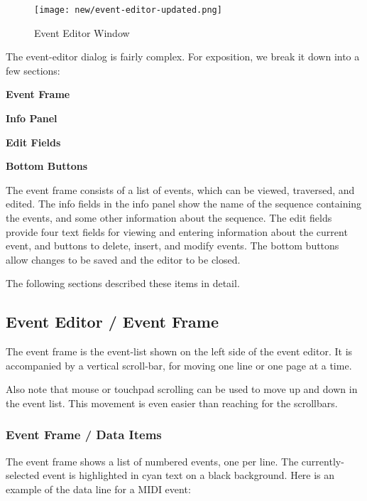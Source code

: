 \begin{figure}[H]
   \centering 
   \texttt{[image: new/event-editor-updated.png]}
   \caption{Event Editor Window}
   \label{fig:event_editor_window}
\end{figure}

   The event-editor dialog is fairly complex.
   For exposition, we break it down into a few sections:

   \begin{enumber}
      \item \textbf{Event Frame}
      \item \textbf{Info Panel}
      \item \textbf{Edit Fields}
      \item \textbf{Bottom Buttons}
   \end{enumber}

   The event frame consists of a list of events, which can be viewed,
   traversed, and edited.  The info fields in the info panel show the name of
   the sequence containing the events, and some other information about the
   sequence.  The edit fields provide four text fields for viewing and entering
   information about the current event, and buttons to delete, insert, and
   modify events.  The bottom buttons allow changes to be saved and the editor
   to be closed.  

   The following sections described these items in detail.

\subsection{Event Editor / Event Frame}
\label{subsec:seq64_event_editor_frame}

   The event frame is the event-list shown on the left side of the
   event editor.  It is accompanied by a vertical scroll-bar, for moving one
   line or one page at a time.

   Also note that mouse or touchpad scrolling can be used to move up and down
   in the event list.  This movement is even easier than reaching for the
   scrollbars.

\subsubsection{Event Frame / Data Items}
\label{subsec:seq64_event_frame_data}

   The event frame shows a list of numbered events, one per line.
   The currently-selected event is highlighted in cyan text on a black
   background.  Here is an example of the data line for a MIDI event:

